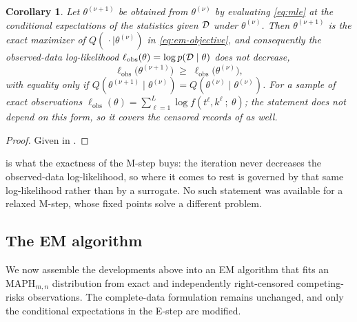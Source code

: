 \documentclass{article}
\newtheorem{corollary}{Corollary}
\newenvironment{rcrevision}{}{}
\newenvironment{subrevision}{}{}
\newcommand{\aachg}[1]{#1}
\newcommand{\subchg}[1]{#1}
\begin{document}
\begin{subrevision}
\begin{corollary}
\label{cor:monotone}
Let $\theta^{(\nu+1)}$ be obtained from $\theta^{(\nu)}$ by evaluating \eqref{eq:mle} at the
conditional expectations of the statistics given ${\cal D}$ under $\theta^{(\nu)}$. Then
$\theta^{(\nu+1)}$ is the exact maximizer of $Q(\,\cdot \mid \theta^{(\nu)})$ in
\eqref{eq:em-objective}, and consequently the observed-data log-likelihood
$\ell_{\mathrm{obs}}(\theta) = \log p({\cal D} \mid \theta)$ does not decrease,
%
\[
\ell_{\mathrm{obs}}\big(\theta^{(\nu+1)}\big) \;\ge\; \ell_{\mathrm{obs}}\big(\theta^{(\nu)}\big),
\]
%
with equality only if $Q(\theta^{(\nu+1)} \mid \theta^{(\nu)}) = Q(\theta^{(\nu)} \mid \theta^{(\nu)})$.
For a sample of exact observations
$\ell_{\mathrm{obs}}(\theta)=\sum_{\ell=1}^L \log f(t^\ell,k^\ell~;~\theta)$; the statement does not
depend on this form, so it covers the censored records of  as well.
\end{corollary}

\begin{proof}
Given in .
\end{proof}
\end{subrevision}


\subchg{ is what the exactness of the M-step buys: the iteration never
decreases the observed-data log-likelihood, so where it comes to rest is governed by that same
log-likelihood rather than by a surrogate. No such statement was available for a relaxed M-step,
whose fixed points solve a different problem.}

\subsection{The EM algorithm}
\label{sec:em-alg}

\begin{rcrevision}
We now assemble the developments above into an EM algorithm that fits an $\text{MAPH}_{m,n}$ distribution from exact and independently right-censored competing-risks observations. \aachg{The complete-data formulation remains unchanged, and only the conditional expectations in the E-step are modified.}
\end{rcrevision}
\end{document}
